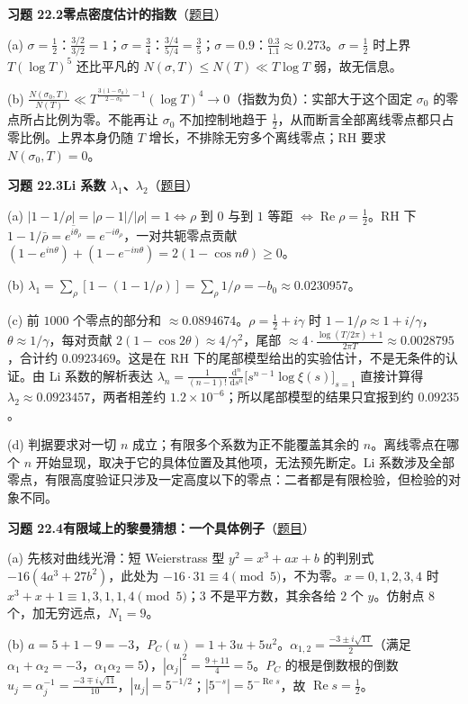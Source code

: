 \documentclass[11pt,a4paper]{article}
\newcommand{\dd}{\,\mathrm{d}}
\renewcommand{\Re}{\operatorname{Re}}
\newcommand{\Sol}[2]{%
  \par\addvspace{1.2em}\noindent
  \hypertarget{s:#1}{}\textbf{习题 #1\quad #2}\hfill{\small（\hyperlink{q:#1}{题目}）}\par
  \nopagebreak\smallskip}
\begin{document}
\Sol{22.2}{零点密度估计的指数}
(a) $\sigma=\frac12$：$\frac{3/2}{3/2}=1$；$\sigma=\frac34$：$\frac{3/4}{5/4}=\frac35$；$\sigma=0.9$：$\frac{0.3}{1.1}\approx0.273$。$\sigma=\frac12$ 时上界 $T(\log T)^5$ 还比平凡的 $N(\sigma,T)\le N(T)\ll T\log T$ 弱，故无信息。

(b) $\frac{N(\sigma_0,T)}{N(T)}\ll T^{\frac{3(1-\sigma_0)}{2-\sigma_0}-1}(\log T)^4\to0$（指数为负）：实部大于这个固定 $\sigma_0$ 的零点所占比例为零。不能再让 $\sigma_0$ 不加控制地趋于 $\frac12$，从而断言全部离线零点都只占零比例。上界本身仍随 $T$ 增长，不排除无穷多个离线零点；RH 要求 $N(\sigma_0,T)=0$。

\Sol{22.3}{Li 系数 $\lambda_1$、$\lambda_2$}
(a) $|1-1/\rho|=|\rho-1|/|\rho|=1\iff\rho$ 到 $0$ 与到 $1$ 等距 $\iff\Re\rho=\frac12$。RH 下 $1-1/\bar\rho=\overline{e^{i\theta_\rho}}=e^{-i\theta_\rho}$，一对共轭零点贡献 $(1-e^{in\theta})+(1-e^{-in\theta})=2(1-\cos n\theta)\ge0$。

(b) $\lambda_1=\sum_\rho[1-(1-1/\rho)]=\sum_\rho1/\rho=-b_0\approx0.0230957$。

(c) 前 $1000$ 个零点的部分和 $\approx0.0894674$。$\rho=\frac12+i\gamma$ 时 $1-1/\rho\approx1+i/\gamma$，$\theta\approx1/\gamma$，每对贡献 $2(1-\cos2\theta)\approx4/\gamma^2$，尾部 $\approx4\cdot\frac{\log(T/2\pi)+1}{2\pi T}\approx0.0028795$，合计约 $0.0923469$。这是在 RH 下的尾部模型给出的实验估计，不是无条件的认证。由 Li 系数的解析表达 $\lambda_n=\frac1{(n-1)!}\frac{\dd^n}{\dd s^n}\bigl[s^{n-1}\log\xi(s)\bigr]_{s=1}$ 直接计算得 $\lambda_2\approx0.0923457$，两者相差约 $1.2\times10^{-6}$；所以尾部模型的结果只宜报到约 $0.09235$。

(d) 判据要求对一切 $n$ 成立；有限多个系数为正不能覆盖其余的 $n$。离线零点在哪个 $n$ 开始显现，取决于它的具体位置及其他项，无法预先断定。Li 系数涉及全部零点，有限高度验证只涉及一定高度以下的零点：二者都是有限检验，但检验的对象不同。

\Sol{22.4}{有限域上的黎曼猜想：一个具体例子}
(a) 先核对曲线光滑：短 Weierstrass 型 $y^2=x^3+ax+b$ 的判别式 $-16(4a^3+27b^2)$，此处为 $-16\cdot31\equiv4\pmod5$，不为零。$x=0,1,2,3,4$ 时 $x^3+x+1\equiv1,3,1,1,4\pmod5$；$3$ 不是平方数，其余各给 $2$ 个 $y$。仿射点 $8$ 个，加无穷远点，$N_1=9$。

(b) $a=5+1-9=-3$，$P_C(u)=1+3u+5u^2$。$\alpha_{1,2}=\frac{-3\pm i\sqrt{11}}2$（满足 $\alpha_1+\alpha_2=-3$，$\alpha_1\alpha_2=5$），$|\alpha_j|^2=\frac{9+11}4=5$。$P_C$ 的根是倒数根的倒数 $u_j=\alpha_j^{-1}=\frac{-3\mp i\sqrt{11}}{10}$，$|u_j|=5^{-1/2}$；$|5^{-s}|=5^{-\Re s}$，故 $\Re s=\frac12$。
\end{document}
